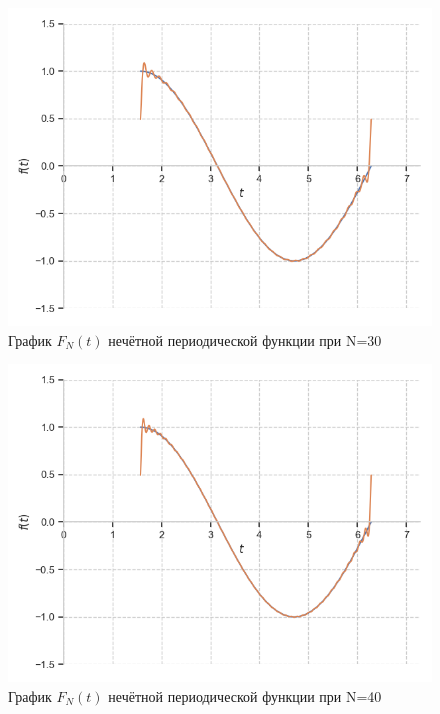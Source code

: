 \documentclass[a4paper, 16pt]{article}
\begin{document}
\begin{figure}[!htb]
    \centering
    \includegraphics[scale=0.8]{fur_sin_n=30.png}
    \captionsetup{skip=0pt}
    \caption{График $F_N(t)$ нечётной периодической функции при N=30}
    \label{Рис:26}
\end{figure}
\newpage
\begin{figure}[!htb]
    \centering
    \includegraphics[scale=0.8]{fur_sin_n=40.png}
    \captionsetup{skip=0pt}
    \caption{График $F_N(t)$ нечётной периодической функции при N=40}
    \label{Рис:27}
\end{figure}
\end{document}

